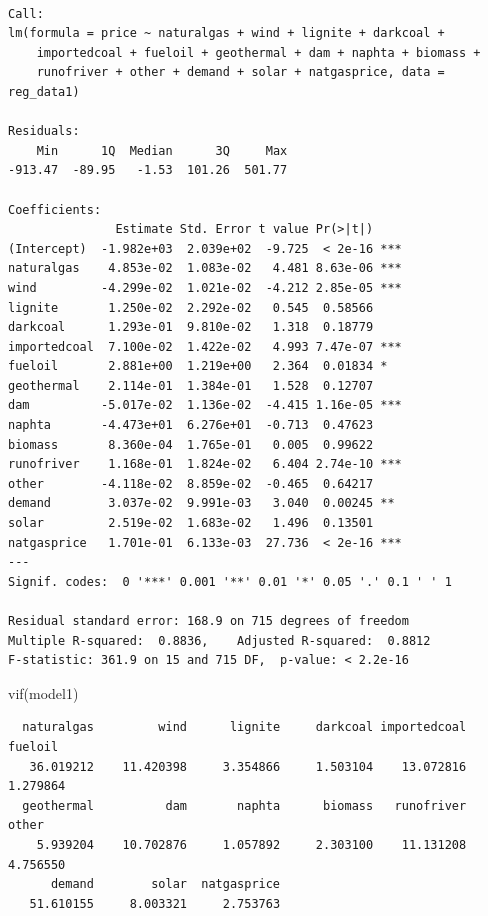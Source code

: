 \documentclass[
]{article}
\newenvironment{Shaded}{\begin{snugshade}}{\end{snugshade}}
\newcommand{\FunctionTok}[1]{\textcolor[rgb]{0.28,0.35,0.67}{#1}}
\newcommand{\NormalTok}[1]{\textcolor[rgb]{0.00,0.23,0.31}{#1}}
\begin{document}
\begin{verbatim}

Call:
lm(formula = price ~ naturalgas + wind + lignite + darkcoal + 
    importedcoal + fueloil + geothermal + dam + naphta + biomass + 
    runofriver + other + demand + solar + natgasprice, data = reg_data1)

Residuals:
    Min      1Q  Median      3Q     Max 
-913.47  -89.95   -1.53  101.26  501.77 

Coefficients:
               Estimate Std. Error t value Pr(>|t|)    
(Intercept)  -1.982e+03  2.039e+02  -9.725  < 2e-16 ***
naturalgas    4.853e-02  1.083e-02   4.481 8.63e-06 ***
wind         -4.299e-02  1.021e-02  -4.212 2.85e-05 ***
lignite       1.250e-02  2.292e-02   0.545  0.58566    
darkcoal      1.293e-01  9.810e-02   1.318  0.18779    
importedcoal  7.100e-02  1.422e-02   4.993 7.47e-07 ***
fueloil       2.881e+00  1.219e+00   2.364  0.01834 *  
geothermal    2.114e-01  1.384e-01   1.528  0.12707    
dam          -5.017e-02  1.136e-02  -4.415 1.16e-05 ***
naphta       -4.473e+01  6.276e+01  -0.713  0.47623    
biomass       8.360e-04  1.765e-01   0.005  0.99622    
runofriver    1.168e-01  1.824e-02   6.404 2.74e-10 ***
other        -4.118e-02  8.859e-02  -0.465  0.64217    
demand        3.037e-02  9.991e-03   3.040  0.00245 ** 
solar         2.519e-02  1.683e-02   1.496  0.13501    
natgasprice   1.701e-01  6.133e-03  27.736  < 2e-16 ***
---
Signif. codes:  0 '***' 0.001 '**' 0.01 '*' 0.05 '.' 0.1 ' ' 1

Residual standard error: 168.9 on 715 degrees of freedom
Multiple R-squared:  0.8836,    Adjusted R-squared:  0.8812 
F-statistic: 361.9 on 15 and 715 DF,  p-value: < 2.2e-16
\end{verbatim}

\begin{Shaded}
\begin{Highlighting}[]
\FunctionTok{vif}\NormalTok{(model1)}
\end{Highlighting}
\end{Shaded}

\begin{verbatim}
  naturalgas         wind      lignite     darkcoal importedcoal      fueloil 
   36.019212    11.420398     3.354866     1.503104    13.072816     1.279864 
  geothermal          dam       naphta      biomass   runofriver        other 
    5.939204    10.702876     1.057892     2.303100    11.131208     4.756550 
      demand        solar  natgasprice 
   51.610155     8.003321     2.753763 
\end{verbatim}
\end{document}
